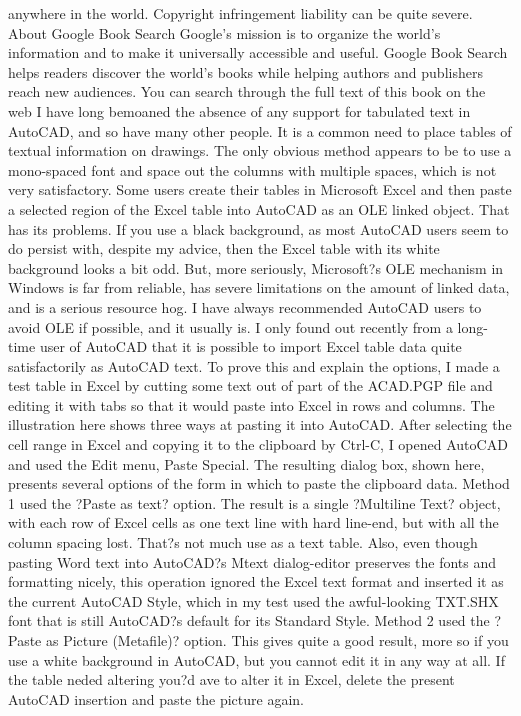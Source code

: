 \documentclass[a4paper]{article}
\begin{document}
{anywhere in the world. Copyright infringement liability can be quite severe. 
About Google Book Search 
Google's mission is to organize the world's information and to make it universally accessible and useful. Google Book Search helps readers 
discover the world's books while helping authors and publishers reach new audiences. You can search through the full text of this book on the web 
I have long bemoaned the absence of any support for tabulated text in AutoCAD, and so have many other people. It is a common need to place tables of textual information on drawings. The only obvious method appears to be to use a mono-spaced font and space out the columns with multiple spaces, which is not very satisfactory.
Some users create their tables in Microsoft Excel and then paste a selected region of the Excel table into AutoCAD as an OLE linked object. That has its problems. If you use a black background, as most AutoCAD users seem to do persist with, despite my advice, then the Excel table with its white background looks a bit odd. But, more seriously, Microsoft?s OLE mechanism in Windows is far from reliable, has severe limitations on the amount of linked data, and is a serious resource hog. I have always recommended AutoCAD users to avoid OLE if possible, and it usually is.
I only found out recently from a long-time user of AutoCAD that it is possible to import Excel table data quite satisfactorily as AutoCAD text. To prove this and explain the options, I made a test table in Excel by cutting some text out of part of the ACAD.PGP file and editing it with tabs so that it would paste into Excel in rows and columns. The illustration here shows three ways at pasting it into AutoCAD. After selecting the cell range in Excel and copying it to the clipboard by Ctrl-C, I opened AutoCAD and used the Edit menu, Paste Special. The resulting dialog box, shown here, presents several options of the form in which to paste the clipboard data.
Method 1 used the ?Paste as text? option. The result is a single ?Multiline Text? object, with each row of Excel cells as one text line with hard line-end, but with all the column spacing lost. That?s not much use as a text table. Also, even though pasting Word text into AutoCAD?s Mtext dialog-editor preserves the fonts and formatting nicely, this operation ignored the Excel text format and inserted it as the current AutoCAD Style, which in my test used the awful-looking TXT.SHX font that is still AutoCAD?s default for its Standard Style.
Method 2 used the ?Paste as Picture (Metafile)? option. This gives quite a good result, more so if you use a white background in AutoCAD, but you cannot edit it in any way at all. If the table neded altering you?d ave to alter it in Excel, delete the present AutoCAD insertion and paste the picture again.
}
\end{document}
